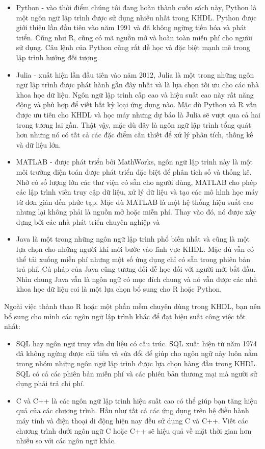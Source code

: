 \documentclass[
]{article}
\providecommand{\tightlist}{%
  \setlength{\itemsep}{0pt}\setlength{\parskip}{0pt}}
\begin{document}
\begin{itemize}
\item
  Python - vào thời điểm chúng tôi đang hoàn thành cuốn sách này, Python là một ngôn ngữ lập trình được sử dụng nhiều nhất trong KHDL. Python được giới thiệu lần đầu tiên vào năm 1991 và đã không ngừng tiến hóa và phát triển. Cũng như R, cũng có mã nguồn mở và hoàn toàn miễn phí cho người sử dụng. Câu lệnh của Python cũng rất dễ học và đặc biệt mạnh mẽ trong lập trình hướng đối tượng.
\item
  Julia - xuất hiện lần đầu tiên vào năm 2012, Julia là một trong những ngôn ngữ lập trình được phát hành gần đây nhất và là lựa chọn tối ưu cho các nhà khoa học dữ liệu. Ngôn ngữ lập trình cấp cao và hiệu suất cao này rất năng động và phù hợp để viết bất kỳ loại ứng dụng nào. Mặc dù Python và R vẫn được ưu tiên cho KHDL và học máy nhưng dự báo là Julia sẽ vượt qua cả hai trong tương lai gần. Thật vậy, mặc dù đây là ngôn ngữ lập trình tổng quát hơn nhưng nó có tất cả các đặc điểm cần thiết để xử lý phân tích, thống kê và dữ liệu lớn.
\item
  MATLAB - được phát triển bởi MathWorks, ngôn ngữ lập trình này là một môi trường điện toán được phát triển đặc biệt để phân tích số và thống kê. Nhờ có số lượng lớn các thư viện có sẵn cho người dùng, MATLAB cho phép các lập trình viên truy cập dữ liệu, xử lý dữ liệu và tạo các mô hình học máy từ đơn giản đến phức tạp. Mặc dù MATLAB là một hệ thống hiệu suất cao nhưng lại không phải là nguồn mở hoặc miễn phí. Thay vào đó, nó được xây dựng bởi các nhà phát triển chuyên nghiệp và
\item
  Java là một trong những ngôn ngữ lập trình phổ biến nhất và cũng là một lựa chọn cho những người khi mới bước vào lĩnh vực KHDL. Mặc dù vẫn có thể tải xuống miễn phí nhưng một số ứng dụng chỉ có sẵn trong phiên bản trả phí. Cú pháp của Java cũng tương đối dễ học đối với người mới bắt đầu. Nhìn chung Java vẫn là ngôn ngữ có mục đích chung và nó vẫn được các nhà khoa học dữ liệu coi là một lựa chọn bổ sung cho R hoặc Python.
\end{itemize}

Ngoài việc thành thạo R hoặc một phần mềm chuyên dùng trong KHDL, bạn nên bổ sung cho mình các ngôn ngữ lập trình khác để đạt hiệu suất công việc tốt nhất:

\begin{itemize}
\tightlist
\item
  SQL hay ngôn ngữ truy vấn dữ liệu có cấu trúc. SQL xuất hiện từ năm 1974 đã không ngừng được cải tiến và sửa đổi để giúp cho ngôn ngữ này luôn nằm trong nhóm những ngôn ngữ lập trình được lựa chọn hàng đầu trong KHDL. SQL có cả các phiên bản miễn phí và các phiên bản thương mại mà người sử dụng phải trả chi phí.
\item
  C và C++ là các ngôn ngữ lập trình hiệu suất cao có thể giúp bạn tăng hiệu quả của các chương trình. Hầu như tất cả các ứng dụng trên hệ điều hành máy tính và điện thoại di động hiện nay đều sử dụng C và C++. Viết các chương trình dưới ngôn ngữ C hoặc C++ sẽ hiệu quả về mặt thời gian hơn nhiều so với các ngôn ngữ khác.
\end{itemize}
\end{document}
